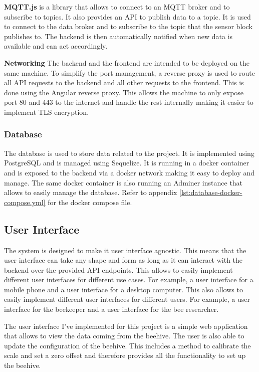 \textbf{MQTT.js} is a library that allows to connect to an MQTT broker and to subscribe to topics. It also provides an API to publish data to a topic. It is used to connect to the data broker and to subscribe to the topic that the sensor block publishes to. The backend is then automatically notified when new data is available and can act accordingly.

\textbf{Networking}
The backend and the frontend are intended to be deployed on the same machine. To simplify the port management, a reverse proxy is used to route all API requests to the backend and all other requests to the frontend. This is done using the Angular reverse proxy. This allows the machine to only expose port 80 and 443 to the internet and handle the rest internally making it easier to implement TLS encryption.

\subsubsection {Database} \label{sec:database}
The database is used to store data related to the project. It is implemented using PostgreSQL and is managed using Sequelize. It is running in a docker container and is exposed to the backend via a docker network making it easy to deploy and manage. The same docker container is also running an Adminer instance that allows to easily manage the database. Refer to appendix \ref{lst:database-docker-compose.yml} for the docker compose file.

\newpage
\subsection{User Interface}\label{sec:user_interface}
The system is designed to make it user interface agnostic. This means that the user interface can take any shape and form as long as it can interact with the backend over the provided API endpoints. This allows to easily implement different user interfaces for different use cases. For example, a user interface for a mobile phone and a user interface for a desktop computer. This also allows to easily implement different user interfaces for different users. For example, a user interface for the beekeeper and a user interface for the bee researcher.

The user interface I've implemented for this project is a simple web application that allows to view the data coming from the beehive. The user is also able to update the configuration of the beehive. This includes a method to calibrate the scale and set a zero offset and therefore provides all the functionality to set up the beehive.

